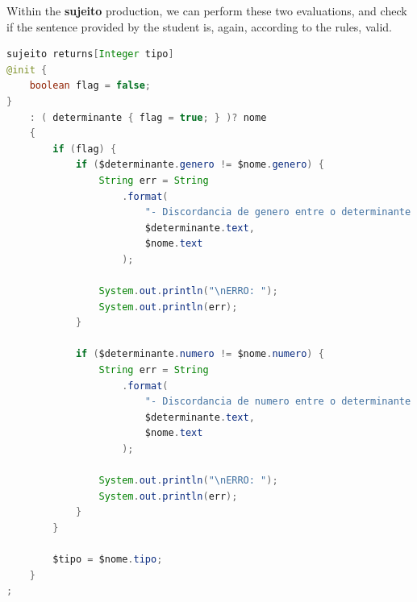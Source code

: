 %    


Within the \textbf{sujeito} production, we can perform these two evaluations, and check if the sentence provided by the student is, again, according to the rules, valid.

\begin{center}
\begin{minipage}{13cm}
\begin{lstlisting}[language=java, basicstyle=\tiny, label={sujeito_dsl_excerpt}, caption=Example of gender/number validation within the ``sujeito'' production]
sujeito returns[Integer tipo]
@init {
    boolean flag = false;
}
    : ( determinante { flag = true; } )? nome
    {
        if (flag) {
            if ($determinante.genero != $nome.genero) {
                String err = String
                    .format(
                        "- Discordancia de genero entre o determinante '%s' e o nome '%s'.",
                        $determinante.text,
                        $nome.text
                    );

                System.out.println("\nERRO: ");
                System.out.println(err);
            }

            if ($determinante.numero != $nome.numero) {
                String err = String
                    .format(
                        "- Discordancia de numero entre o determinante '%s' e o nome '%s'.",
                        $determinante.text,
                        $nome.text
                    );

                System.out.println("\nERRO: ");
                System.out.println(err);
            }
        }

        $tipo = $nome.tipo;
    }
;
\end{lstlisting}
\end{minipage}
\end{center}

